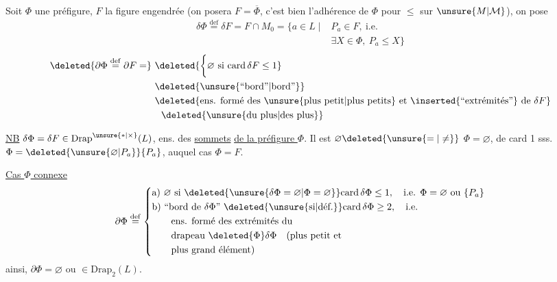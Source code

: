 
Soit $\Phi$ une préfigure, $F$ la figure engendrée (on posera $F=\overline{\Phi}$, c'est bien l'adhérence de $\Phi$ pour $\leq$ sur $\unsure{M|\mathcal M}$), on pose
\[
\begin{aligned}
\delta\Phi\overset{\mathrm{def}}{=}\delta F=F\cap M_0
  =\bigl\{a\in L\mid{}& P_a\in F,\ \text{i.e.}\\[-2pt]
  &\exists X\in\Phi,\ P_a\leq X\bigr\}
\end{aligned}
\]
\[
\begin{aligned}
\deleted{\partial\Phi\overset{\mathrm{def}}{=}\partial F=}
&\ \deleted{\biggl\{\varnothing\ \text{si }\mathrm{card}\,\delta F\leq1}\\
&\ \deleted{\text{\unsure{``bord''|bord''}}}\\
&\ \deleted{\text{ens. formé des }\unsure{\text{plus petit}|\text{plus petits}}\text{ et }\inserted{\text{``extrémités''}}\text{ de }\delta F}\\
&\quad\deleted{\text{\unsure{du plus|des plus}}}
\end{aligned}
\]

\uline{NB} $\delta\Phi=\delta F\in\mathrm{Drap}^{\unsure{*|\times}}(L)$, ens. des   \uline{sommets}  \uline{de la préfigure $\Phi$}. Il est $\varnothing\deleted{\unsure{=|\ne}}$  $\Phi=\varnothing$,  de card 1 sss. $\Phi=\deleted{\unsure{\varnothing|P_a}}\{P_a\}$, auquel cas $\Phi=F$.


\uline{Cas $\Phi$ connexe}
\[
\partial\Phi\overset{\mathrm{def}}{=}
\left\{\begin{aligned}
&\text{a) }\varnothing\ \text{si }\deleted{\unsure{\delta\Phi=\varnothing|\Phi=\varnothing}}\mathrm{card}\,\delta\Phi\leq1,\quad\text{i.e. }\Phi=\varnothing\ \text{ou }\{P_a\}\\
&\text{b) ``bord de }\delta\Phi\text{'' }\deleted{\text{\unsure{si|déf.}}}\mathrm{card}\,\delta\Phi\geq2,\quad\text{i.e.}\\
&\qquad\text{ens. formé des extrémités du}\\
&\qquad\text{drapeau }\deleted{\Phi}\delta\Phi\quad\text{(plus petit et}\\
&\qquad\text{plus grand élément)}
\end{aligned}\right.
\]
ainsi, $\partial\Phi=\varnothing$ ou $\in\mathrm{Drap}_2(L)$.

